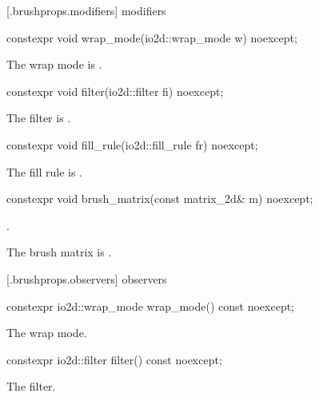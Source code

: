  [\iotwod.brushprops.modifiers] { modifiers}

%
\begin{itemdecl}
constexpr void wrap_mode(io2d::wrap_mode w) noexcept;
\end{itemdecl}
\begin{itemdescr}
\pnum
\effects
The wrap mode is .
\end{itemdescr}

%
\begin{itemdecl}
constexpr void filter(io2d::filter fi) noexcept;
\end{itemdecl}
\begin{itemdescr}
\pnum
\effects
The filter is .
\end{itemdescr}

%
\begin{itemdecl}
constexpr void fill_rule(io2d::fill_rule fr) noexcept;
\end{itemdecl}
\begin{itemdescr}
\pnum
\effects
The fill rule is .
\end{itemdescr}

%
\begin{itemdecl}
constexpr void brush_matrix(const matrix_2d& m) noexcept;
\end{itemdecl}
\begin{itemdescr}
\pnum
\requires
{}.

\pnum
\effects
The brush matrix is .
\end{itemdescr}

 [\iotwod.brushprops.observers] { observers}

%
\begin{itemdecl}
constexpr io2d::wrap_mode wrap_mode() const noexcept;
\end{itemdecl}
\begin{itemdescr}
\pnum
\returns
The wrap mode.
\end{itemdescr}

%
\begin{itemdecl}
constexpr io2d::filter filter() const noexcept;
\end{itemdecl}
\begin{itemdescr}
\pnum
\returns
The filter.
\end{itemdescr}

